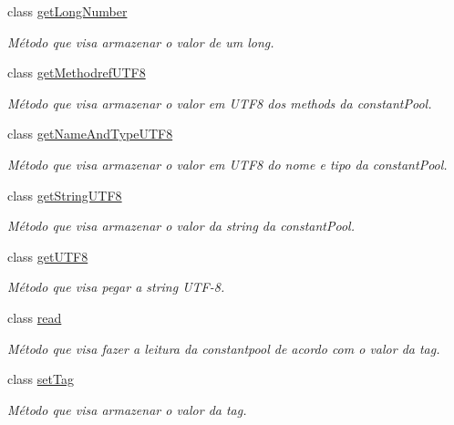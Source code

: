 \begin{DoxyCompactItemize}
class \hyperlink{classCPInfo_1_1getLongNumber}{get\+Long\+Number}
\begin{DoxyCompactList}\small\item\em Método que visa armazenar o valor de um long. \end{DoxyCompactList}\item 
class \hyperlink{classCPInfo_1_1getMethodrefUTF8}{get\+Methodref\+U\+T\+F8}
\begin{DoxyCompactList}\small\item\em Método que visa armazenar o valor em U\+T\+F8 dos methods da constant\+Pool. \end{DoxyCompactList}\item 
class \hyperlink{classCPInfo_1_1getNameAndTypeUTF8}{get\+Name\+And\+Type\+U\+T\+F8}
\begin{DoxyCompactList}\small\item\em Método que visa armazenar o valor em U\+T\+F8 do nome e tipo da constant\+Pool. \end{DoxyCompactList}\item 
class \hyperlink{classCPInfo_1_1getStringUTF8}{get\+String\+U\+T\+F8}
\begin{DoxyCompactList}\small\item\em Método que visa armazenar o valor da string da constant\+Pool. \end{DoxyCompactList}\item 
class \hyperlink{classCPInfo_1_1getUTF8}{get\+U\+T\+F8}
\begin{DoxyCompactList}\small\item\em Método que visa pegar a string U\+T\+F-\/8. \end{DoxyCompactList}\item 
class \hyperlink{classCPInfo_1_1read}{read}
\begin{DoxyCompactList}\small\item\em Método que visa fazer a leitura da constantpool de acordo com o valor da tag. \end{DoxyCompactList}\item 
class \hyperlink{classCPInfo_1_1setTag}{set\+Tag}
\begin{DoxyCompactList}\small\item\em Método que visa armazenar o valor da tag. \end{DoxyCompactList}\end{DoxyCompactItemize}
